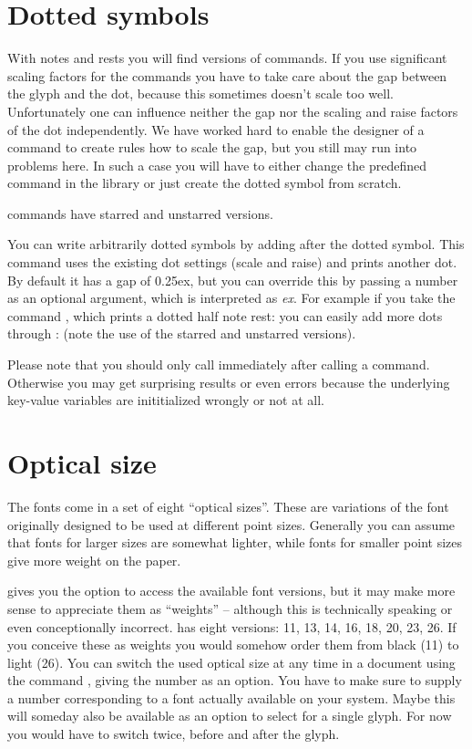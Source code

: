 \documentclass{OLLbook}
\begin{document}
\section{Dotted symbols}
\label{sec:dotted_symbols}
With notes and rests you will find  versions of commands.
If you use significant scaling factors for the commands you have to take care about the gap between the glyph and the dot, because this sometimes doesn't scale too well.
Unfortunately one can influence neither the gap nor the scaling and raise factors of the dot independently.
We have worked hard to enable the designer of a command to create rules how to scale the gap, but you still may run into problems here. 
In such a case you will have to either change the predefined command in the library or just create the dotted symbol from scratch.

 commands have starred and unstarred versions.

You can write arbitrarily dotted symbols by adding  after the dotted symbol. 
This command uses the existing dot settings (scale and raise) and prints another dot. 
By default it has a gap of 0.25ex, but you can override this by passing a number as an optional argument, which is interpreted as \emph{ex}.
For example if you take the command , which prints a dotted half note rest: \halfNoteRestDotted  you can easily add more dots through : \halfNoteRestDotted*\lilyPrintMoreDots (note the use of the starred and unstarred versions).

Please note that you should only call  immediately after calling a  command. Otherwise you may get surprising results or even errors because the underlying key-value variables are inititialized wrongly or not at all.

\section{Optical size}
\label{sec:optical_size}
The \emmentaler fonts come in a set of eight “optical sizes”.
These are variations of the font originally designed to be used at different point sizes.
Generally you can assume that fonts for larger sizes are somewhat lighter, while fonts for smaller point sizes give more weight on the paper.

\lilyglyphs gives you the option to access the available font versions, but it may make more sense to appreciate them as “weights” -- although this is technically speaking or even conceptionally incorrect.
\emmentaler has eight versions: 11, 13, 14, 16, 18, 20, 23, 26. 
If you conceive these as weights you would somehow order them from black (11) to light (26).
You can switch the used optical size at any time in a document using the command , giving the number as an option. 
You have to make sure to supply a number corresponding to a font actually available on your system.
Maybe this will someday also be available as an option to select for a single glyph.
For now you would have to switch twice, before and after the glyph.
\end{document}
